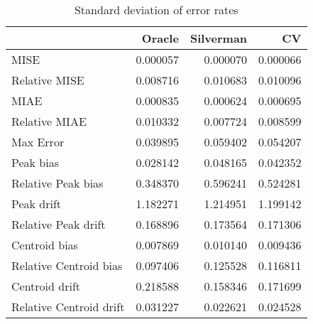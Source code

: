 \begin{table}[ht]
\centering
\begin{tabular}{lrrr}
  \hline
 & Oracle & Silverman & CV \\ 
  \hline
MISE & 0.000057 & 0.000070 & 0.000066 \\ 
  Relative MISE & 0.008716 & 0.010683 & 0.010096 \\ 
  MIAE & 0.000835 & 0.000624 & 0.000695 \\ 
  Relative MIAE & 0.010332 & 0.007724 & 0.008599 \\ 
  Max Error & 0.039895 & 0.059402 & 0.054207 \\ 
  Peak bias & 0.028142 & 0.048165 & 0.042352 \\ 
  Relative Peak bias & 0.348370 & 0.596241 & 0.524281 \\ 
  Peak drift & 1.182271 & 1.214951 & 1.199142 \\ 
  Relative Peak drift & 0.168896 & 0.173564 & 0.171306 \\ 
  Centroid bias & 0.007869 & 0.010140 & 0.009436 \\ 
  Relative Centroid bias & 0.097406 & 0.125528 & 0.116811 \\ 
  Centroid drift & 0.218588 & 0.158346 & 0.171699 \\ 
  Relative Centroid drift & 0.031227 & 0.022621 & 0.024528 \\ 
   \hline
\end{tabular}
\caption{Standard deviation of error rates} 
\label{tbl:stddev_error_rates}
\end{table}
